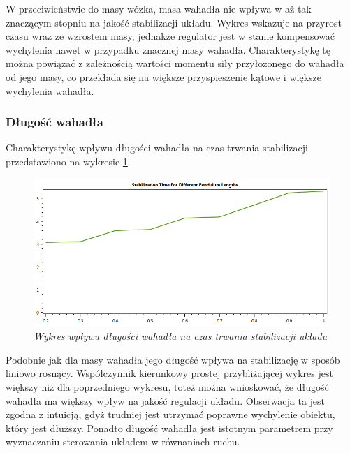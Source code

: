 \documentclass[12pt, oneside]{report}
\theoremstyle{definition}
\begin{document}
W przeciwieństwie do masy wózka, masa wahadła nie wpływa w aż tak znaczącym stopniu na jakość stabilizacji układu. Wykres wskazuje na przyrost czasu wraz ze wzrostem masy, jednakże regulator jest w stanie kompensować wychylenia nawet w przypadku znacznej masy wahadła. Charakterystykę tę można powiązać z zależnością wartości momentu siły przyłożonego do wahadła od jego masy, co przekłada się na większe przyspieszenie kątowe i większe wychylenia wahadła.

\newpage
\subsubsection{Długość wahadła}
Charakterystykę wpływu długości wahadła na czas trwania stabilizacji przedstawiono na wykresie \ref{plot:PendulumLengthQuality}.
\begin{figure}[H]
	\centering
		\includegraphics[width = 350pt]{PendulumLengthQuality} 
		\caption{\textit{Wykres wpływu długości wahadła na czas trwania stabilizacji układu}}
		\label{plot:PendulumLengthQuality}
\end{figure}

Podobnie jak dla masy wahadła jego długość wpływa na stabilizację w sposób liniowo rosnący. Współczynnik kierunkowy prostej przybliżającej wykres jest większy niż dla poprzedniego wykresu, toteż można wnioskować, że długość wahadła ma większy wpływ na jakość regulacji układu. Obserwacja ta jest zgodna z intuicją, gdyż trudniej jest utrzymać poprawne wychylenie obiektu, który jest dłuższy. Ponadto długość wahadła jest istotnym parametrem przy wyznaczaniu sterowania układem w równaniach ruchu. 

\newpage
\end{document}
